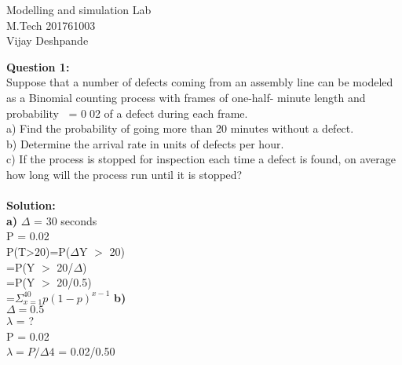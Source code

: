 \documentclass[11pt, a4paper]{article}
\begin{document}
	\begin{center}
		\Huge{Modelling and simulation Lab}\\
		 M.Tech 201761003\\
		 Vijay Deshpande
	\end{center}

\textbf{Question 1:}	\\
Suppose that a number of defects coming from an assembly line can be modeled
as a Binomial counting process with frames of one-half- minute length and
probability = 002 of a defect during each frame.\\
a) Find the probability of going more than 20 minutes without a defect.\\
b) Determine the arrival rate in units of defects per hour.\\
c) If the process is stopped for inspection each time a defect is found, on average
how long will the process run until it is stopped?	\\
\vspace*{5mm}	\\
\textbf{Solution: }	\\
\textbf{a)}
$\Delta$ = 30 seconds\\
P = 0.02\\
P(T>20)=P($\Delta$Y $>$ 20)\\
\hspace*{15mm} =P(Y  $>$ 20/$\Delta$)\\	
\hspace*{15mm} =P(Y $>$ 20/0.5)\\	
\hspace*{15mm}   =$\Sigma_{x=1}^{40}p(1-p)^{x-1}$
\textbf{b)}\\
$\Delta = 0.5$\\
$\lambda$ = ?	\\
P = 0.02\\
$\lambda = P/\Delta4$
\hspace*{15mm} = 0.02/0.50\\
\end{document}

